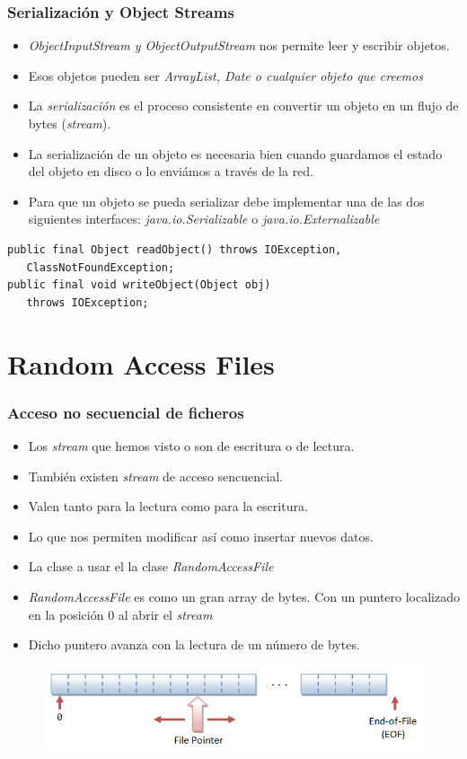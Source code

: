 \documentclass{beamer}
\begin{document}
\begin{frame}[fragile]
\frametitle{Serialización y Object Streams}
\begin{itemize}[<+->]
\item \emph{ObjectInputStream y ObjectOutputStream} nos permite leer y escribir objetos.
\item Esos objetos pueden ser \emph{ArrayList, Date o cualquier objeto que creemos}
\item La \emph{serialización} es el proceso consistente en convertir un objeto en un flujo de bytes (\emph{stream}).
\item La serialización de un objeto es necesaria bien cuando guardamos el estado del objeto en disco o lo enviámos a través de la red.
\item Para que un objeto se pueda serializar debe implementar una de las dos siguientes interfaces: \emph{java.io.Serializable} o \emph{java.io.Externalizable}
\end{itemize}
\pause
\begin{verbatim}
public final Object readObject() throws IOException, 
   ClassNotFoundException;
public final void writeObject(Object obj) 
   throws IOException;
\end{verbatim}
\end{frame}


\section{Random Access Files}
\begin{frame}[fragile]
\frametitle{Acceso no secuencial de ficheros}
\begin{itemize}[<+->]
\item Los \emph{stream} que hemos visto o son de escritura o de lectura.
\item También existen \emph{stream} de acceso sencuencial.
\item Valen tanto para la lectura como para la escritura.
\item Lo que nos permiten modificar así como insertar nuevos datos.
\item La clase a usar el la clase \emph{RandomAccessFile}
\item \emph{RandomAccessFile} es como un gran array de bytes. Con un puntero localizado en la posición 0 al abrir el \emph{stream}
\item Dicho puntero avanza con la lectura de un número de bytes.
\end{itemize}
\pause
\begin{figure}
\includegraphics[scale=0.6]{imagenes/random.png}
\end{figure}
\end{frame}
\end{document}
